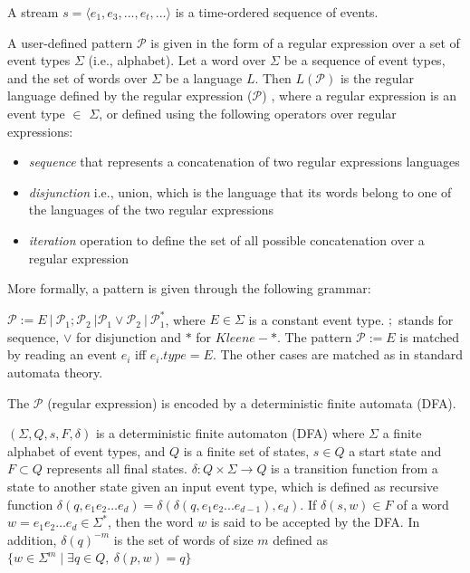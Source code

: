 \begin{definition}
A stream $s=\langle e_1,e_3,...,e_t,...\rangle$  is a time-ordered sequence of events.
\end{definition}


\par A user-defined pattern $\mathcal{P}$ is given in the form of a regular expression over a set of event types $\Sigma$ (i.e., alphabet). Let a word over $\Sigma$ be a sequence of event types, and the set of words over $\Sigma$ be a language $L$. Then $L(\mathcal{P})$ is the regular language defined by the regular expression ($\mathcal{P}$) \cite{hopcroft2006automata,nuel_pattern_2008,alevizos2017event},  where a regular expression is an event type $\in$ $\Sigma$, or defined using the following operators over regular expressions:
 
\begin{itemize}[noitemsep]
	\item \textit{sequence} that represents a concatenation of two regular expressions languages 
	\item \textit{disjunction} i.e., union, which is the language that its words belong to one of the languages of the two regular expressions 
	\item \textit{iteration} operation to define the set of all possible concatenation over a regular expression
\end{itemize}

More formally, a pattern is given through the following grammar:
\begin{definition}
$\mathcal{P} := E\ |\ \mathcal{P}_{1} ; \mathcal{P}_{2}\ | \mathcal{P}_{1} \vee \mathcal{P}_{2}\ |\ \mathcal{P}_{1}^{*}  $, where $E \in \Sigma$ is a constant event type. $;$ stands for sequence, $\vee$ for disjunction and $*$ for $\mathit{Kleene}-*$.
The pattern $\mathcal{P} := E$ is matched by reading an event $e_i$ iff $e_{i}.type = E$.
The other cases are matched as in standard automata theory.
\end{definition}


The $\mathcal{P}$ (regular expression) is encoded by a deterministic finite automata (DFA). 

\begin{definition}
	$(\Sigma,Q,s,F,\delta)$ is a deterministic finite automaton (DFA)  where  $\Sigma$ a finite alphabet of event types, and $Q$ is a finite set of states, $s \in Q$ a start state and $F \subset Q$ represents all final states. $\delta: Q \times \Sigma \rightarrow Q$ is a transition function from a state to another state given an input event type, which is defined as recursive function $\delta(q,e_{1}e_{2}\ldots e_{d})=\delta(\delta(q,e_{1}e_{2}...e_{d-1}),e_{d})$. If $\delta(s,w) \in F$ of a word $w=e_{1}e_{2}\ldots e_{d} \in \Sigma^{*}$, then the word $w$ is said to be accepted by the DFA. In addition,  $\delta(q)^{-m}$ is the set of words of size $m$ defined as $\{w \in \Sigma^{m} \mid \exists q \in Q,\ \delta(p,w)=q \}$
\end{definition}


